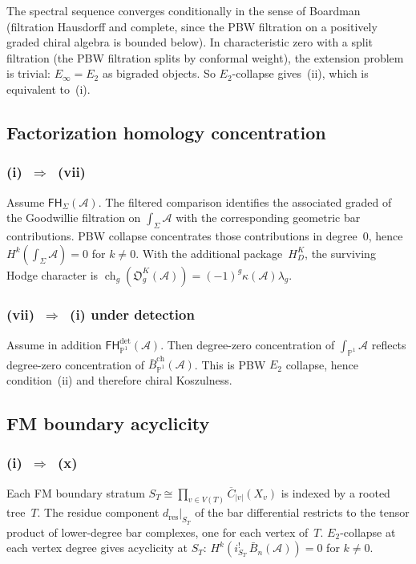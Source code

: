 \documentclass[11pt,reqno]{amsart}
\theoremstyle{definition}
\theoremstyle{remark}
\newcommand{\cA}{\mathcal{A}}
\newcommand{\barB}{\bar{B}}
\newcommand{\barBgeom}{\bar{B}^{\mathrm{ch}}}
\newcommand{\FM}{\overline{C}}
\numberwithin{equation}{section}
\begin{document}
The spectral sequence converges conditionally in the sense of
Boardman (filtration Hausdorff and complete, since the PBW
filtration on a positively graded chiral algebra is bounded
below). In characteristic zero with a split filtration (the PBW
filtration splits by conformal weight), the extension problem is
trivial: $E_\infty = E_2$ as bigraded objects. So $E_2$-collapse
gives~(ii), which is equivalent to~(i).

\subsection{Factorization homology concentration}

\subsubsection*{\textup{(i)}~$\Rightarrow$~\textup{(vii)}}

Assume $\mathsf{FH}_{\Sigma}(\cA)$. The filtered comparison
identifies the associated graded of the Goodwillie filtration on
$\int_{\Sigma}\cA$ with the corresponding geometric bar
contributions. PBW collapse concentrates those contributions in
degree~$0$, hence
$H^k(\int_{\Sigma}\cA)=0$ for $k\neq 0$.  With the additional
package~$H_D^K$, the surviving Hodge character is
$\operatorname{ch}_g(\mathfrak O_g^K(\cA))
=(-1)^g\kappa(\cA)\lambda_g$.

\subsubsection*{\textup{(vii)}~$\Rightarrow$~\textup{(i)} under detection}

Assume in addition
$\mathsf{FH}^{\mathrm{det}}_{\mathbb P^1}(\cA)$. Then
degree-zero concentration of $\int_{\mathbb P^1}\cA$ reflects
degree-zero concentration of $\barBgeom_{\mathbb P^1}(\cA)$.
This is PBW $E_2$ collapse, hence condition~\textup{(ii)} and
therefore chiral Koszulness.

\subsection{FM boundary acyclicity}

\subsubsection*{\textup{(i)}~$\Rightarrow$~\textup{(x)}}

Each FM boundary stratum
$S_T \cong \prod_{v\in V(T)}\FM_{|v|}(X_v)$ is indexed by a
rooted tree~$T$. The residue component $d_{\mathrm{res}}|_{S_T}$
of the bar differential restricts to the tensor product of
lower-degree bar complexes, one for each vertex of~$T$.
$E_2$-collapse at each vertex degree gives acyclicity at $S_T$:
$H^k(i_{S_T}^!\,\barB_n(\cA)) = 0$ for $k \neq 0$.
\end{document}
